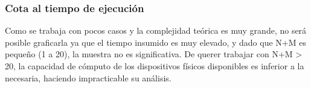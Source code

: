  \subsubsection*{Cota al tiempo de ejecución}


Como se trabaja con pocos casos y la complejidad te\'orica es muy grande, no ser\'a posible graficarla ya que el tiempo insumido es muy elevado, y dado que N+M es pequeño (1 a 20), la muestra no es significativa. De querer trabajar con N+M > 20, la capacidad de cómputo de los dispositivos físicos disponibles es inferior a la necesaria, haciendo impracticable su análisis.



